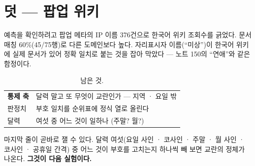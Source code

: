 \documentclass[10pt]{article}
\begin{document}

\section{덧 --- 팝업 위키}

예측을 확인하려고 팝업 메타의 IP 이름 376건으로 한국어 위키 조회수를
긁었다. 문서 매칭 60\%(45/75행)로 다른 도메인보다 높다. 자리표시자
이름(``미상'')이 한국어 위키에 실제 문서가 있어 정확 일치로 붙는 것을
잡아 막았다 --- 노트 150의 ``연애''와 같은 함정이다.

\begin{table}[t]
\centering\tsize
\caption{남은 것.}
\begin{tabular}{ll}
\toprule
\textbf{통제 축} & 달력 말고 또 무엇이 교란인가 --- 지역 · 요일 밖 \\
판정치 & 부호 일치를 순위표에 정식 열로 올린다 \\
달력 & 여섯 중 어느 것이 일하나 (주말? 월?) \\
\bottomrule
\end{tabular}
\end{table}

마지막 줄이 곧바로 잴 수 있다. 달력 여섯(요일 사인 · 코사인 · 주말 · 월
사인 · 코사인 · 공휴일 간격) 중 어느 것이 부호를 고치는지 하나씩 빼 보면
교란의 정체가 나온다. \textbf{그것이 다음 실험이다.}
\end{document}
